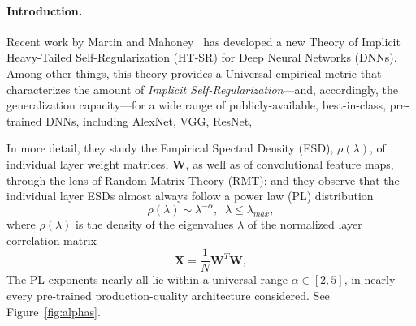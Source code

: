\vspace{-3mm}
\paragraph{Introduction.}

Recent work by Martin and Mahoney~\cite{MM18_TR,MM19_HTSR_ICML} has developed a new Theory of Implicit Heavy-Tailed Self-Regularization (HT-SR) for Deep Neural Networks (DNNs). 
Among other things, this theory provides a Universal empirical metric that characterizes the amount of \emph{Implicit Self-Regularization}---and, accordingly, the generalization capacity---for a wide range of publicly-available, best-in-class, pre-trained DNNs, including AlexNet, VGG, ResNet, 

In more detail, they study the Empirical Spectral Density (ESD), $\rho(\lambda)$, of individual layer weight matrices, $\mathbf{W}$, as well as of convolutional feature maps, through the lens of Random Matrix Theory (RMT); and they observe that the individual layer ESDs almost always follow a  power law (PL) distribution
\begin{equation}
\rho(\lambda)\sim\lambda^{-\alpha},\;\;\lambda\le\lambda_{max},
\label{eqn:eigenval_pl}
\end{equation}
where $\rho(\lambda)$ is the density of the eigenvalues $\lambda$ of the normalized layer correlation matrix 
\begin{equation}
 \mathbf{X} = \frac{1}{N}\mathbf{W}^{T}\mathbf{W},
\end{equation}
The PL exponents nearly all lie within a universal range $\alpha\in[2,5]$, in nearly every pre-trained production-quality architecture considered.
See Figure~\ref{fig:alphas}.

